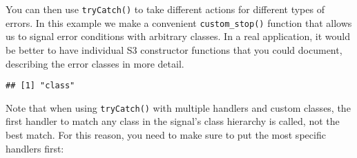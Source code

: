 You can then use \texttt{tryCatch()} to take different actions for
different types of errors. In this example we make a convenient
\texttt{custom\_stop()} function that allows us to signal error
conditions with arbitrary classes. In a real application, it would be
better to have individual S3 constructor functions that you could
document, describing the error classes in more detail.

\begin{Shaded}
\begin{Highlighting}[]
\StringTok{ } \NormalTok{(}\OperatorTok{-}\NormalTok{), }
\StringTok{ }\NormalTok{(}
\NormalTok{\}}

\StringTok{ }
  \NormalTok{ (}\OperatorTok{!}
    \NormalTok{(}\NormalTok{, }\NormalTok{)}
  \NormalTok{ (}\OperatorTok{<}\StringTok{ }\NormalTok{))}
    \NormalTok{(}\NormalTok{, }\NormalTok{)}

\NormalTok{\}}
\NormalTok{(}
  \NormalTok{(}\NormalTok{),}
   \NormalTok{,}
   
\NormalTok{)}
\end{Highlighting}
\end{Shaded}

\begin{verbatim}
## [1] "class"
\end{verbatim}

Note that when using \texttt{tryCatch()} with multiple handlers and
custom classes, the first handler to match any class in the signal's
class hierarchy is called, not the best match. For this reason, you need
to make sure to put the most specific handlers first:

